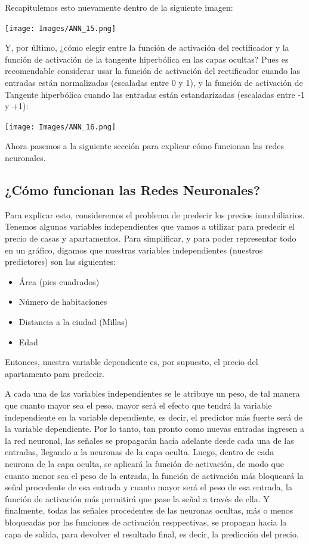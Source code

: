\documentclass[
]{book}
\providecommand{\tightlist}{%
  \setlength{\itemsep}{0pt}\setlength{\parskip}{0pt}}
\begin{document}
Recapitulemos esto nuevamente dentro de la siguiente imagen:

\texttt{[image: Images/ANN\_15.png]}

Y, por último, ¿cómo elegir entre la función de activación del rectificador y la función de activación de la tangente hiperbólica en las capas ocultas? Pues es recomendable considerar usar la función de activación del rectificador cuando las entradas están normalizadas (escaladas entre 0 y 1), y la función de activación de Tangente hiperbólica cuando las entradas están estandarizadas (escaladas entre -1 y +1):

\texttt{[image: Images/ANN\_16.png]}

Ahora pasemos a la siguiente sección para explicar cómo funcionan las redes neuronales.

\hypertarget{cuxf3mo-funcionan-las-redes-neuronales}{%
\subsection{¿Cómo funcionan las Redes Neuronales?}\label{cuxf3mo-funcionan-las-redes-neuronales}}

Para explicar esto, consideremos el problema de predecir los precios inmobiliarios. Tenemos algunas variables independientes que vamos a utilizar para predecir el precio de casas y apartamentos. Para simplificar, y para poder representar todo en un gráfico, digamos que nuestras variables independientes (nuestros predictores) son las siguientes:

\begin{itemize}
\tightlist
\item
  Área (pies cuadrados)
\item
  Número de habitaciones
\item
  Distancia a la ciudad (Millas)
\item
  Edad
\end{itemize}

Entonces, nuestra variable dependiente es, por supuesto, el precio del apartamento para predecir.

A cada una de las variables independientes se le atribuye un peso, de tal manera que cuanto mayor sea el peso, mayor será el efecto que tendrá la variable independiente en la variable dependiente, es decir, el predictor más fuerte será de la variable dependiente. Por lo tanto, tan pronto como nuevas entradas ingresen a la red neuronal, las señales se propagarán hacia adelante desde cada una de las entradas, llegando a la neuronas de la capa oculta. Luego, dentro de cada neurona de la capa oculta, se aplicará la función de activación, de modo que cuanto menor sea el peso de la entrada, la función de activación más bloqueará la señal procedente de esa entrada y cuanto mayor será el peso de esa entrada, la función de activación más permitirá que pase la señal a través de ella. Y finalmente, todas las señales procedentes de las neuronas ocultas, más o menos bloqueadas por las funciones de activación resppectivas, se propagan hacia la capa de salida, para devolver el resultado final, es decir, la predicción del precio.
\end{document}
